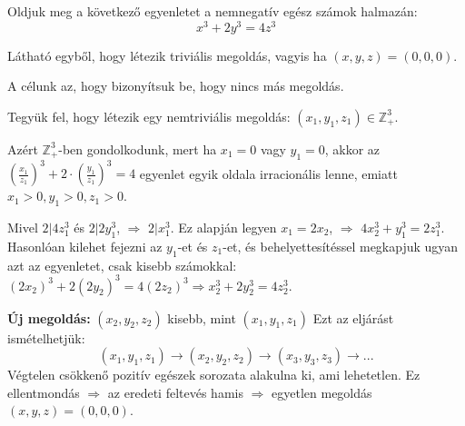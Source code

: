 \begin{problem}
	Oldjuk meg a következő egyenletet a nemnegatív egész
	számok halmazán: 
	\[
	x^{3}+2y^{3}=4z^{3}
	\]
\end{problem}
\begin{solution}
	Látható egyből, hogy létezik triviális megoldás, vagyis ha $(x,y,z)=(0,0,0)$. 
	
	A célunk az, hogy bizonyítsuk be, hogy nincs más megoldás. 
	
	Tegyük fel, hogy létezik egy nemtriviális megoldás: $(x_{1},y_{1},z_{1})\in\mathbb{Z}_{+}^{3}.$ 
	
	Azért $\mathbb{Z}_{+}^{3}$-ben gondolkodunk, mert ha $x_{1}=0$
	vagy $y_{1}=0$, akkor az $(\frac{x_{1}}{z_{1}})^{3}+2\cdot(\frac{y_{1}}{z_{1}})^{3}=4$
	egyenlet egyik oldala irracionális lenne, emiatt $x_{1}>0,y_{1}>0,z_{1}>0$. 
	
	Mivel $2|4z_{1}^{3}$ és $2|2y_{1}^{3}$, $\Rightarrow$ $2|x_{1}^{3}$.
	Ez alapján legyen $x_{1}=2x_{2}$, $\Rightarrow$ $4x_{2}^{3}+y_{1}^{3}=2z_{1}^{3}$.
	Hasonlóan kilehet fejezni az $y_{1}$-et és $z_{1}$-et, és behelyettesítéssel
	megkapjuk ugyan azt az egyenletet, csak kisebb számokkal: $(2x_{2})^{3}+2(2y_{2})^{3}=4(2z_{2})^{3}\Rightarrow x_{2}^{3}+2y_{2}^{3}=4z_{2}^{3}$. 
	
	\textbf{Új megoldás:} $(x_{2},y_{2},z_{2})$ kisebb, mint $(x_{1},y_{1},z_{1})$ 
	Ezt az eljárást ismételhetjük: 
	\[
	(x_{1},y_{1},z_{1})\rightarrow(x_{2},y_{2},z_{2})\rightarrow(x_{3},y_{3},z_{3})\rightarrow...
	\]
	Végtelen csökkenő pozitív egészek sorozata alakulna ki, ami lehetetlen. 
	Ez ellentmondás $\Rightarrow$ az eredeti feltevés hamis $\Rightarrow$
	egyetlen megoldás $(x,y,z)=(0,0,0)$. 
\end{solution}

